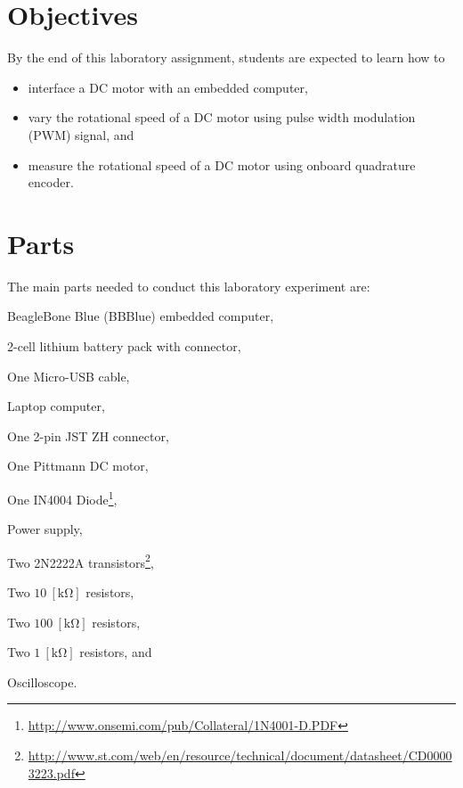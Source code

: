 
\section{Objectives}
By the end of this laboratory assignment, students are expected to learn how to 

\begin{itemize}

\item interface a DC motor with an embedded computer,
  
\item vary the rotational speed of a DC motor using pulse width modulation (PWM) signal, and 
  
\item measure the rotational speed of a DC motor using onboard quadrature encoder.  
 
  
\end{itemize}

\section{Parts}
\label{sec:partsDC_MotorBBBlue}
The main parts needed to conduct this laboratory experiment are: %
%
\begin{inparaenum}[a)]
\item BeagleBone Blue (BBBlue) embedded computer,
\item 2-cell lithium battery pack with connector,
\item One Micro-USB cable, 
\item Laptop computer, 
\item One 2-pin JST ZH connector,
\item One Pittmann DC motor,
\item One IN4004 Diode\footnote{\href{http://www.onsemi.com/pub/Collateral/1N4001-D.PDF}{http://www.onsemi.com/pub/Collateral/1N4001-D.PDF}},
\item Power supply,
\item Two 2N2222A transistors\footnote{\href{http://www.st.com/web/en/resource/technical/document/datasheet/CD00003223.pdf}{http://www.st.com/web/en/resource/technical/document/datasheet/CD00003223.pdf}},
\item Two $10~[\si{\kilo\ohm}]$ resistors,
\item Two $100~[\si{\kilo\ohm}]$ resistors,
\item Two $1~[\si{\kilo\ohm}]$ resistors, and 
\item Oscilloscope.  
\end{inparaenum}


